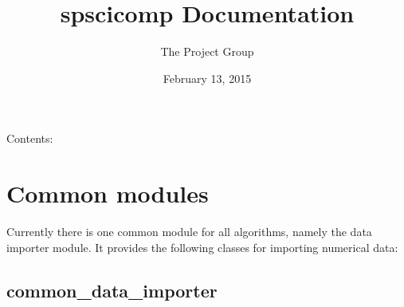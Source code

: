 \documentclass[letterpaper,10pt,english]{sphinxmanual}
\title{spscicomp Documentation}
\date{February 13, 2015}
\author{The Project Group}
\begin{document}
\maketitle
\tableofcontents
{}\label{index::doc}


Contents:


\chapter{Common modules}
\label{common:welcome-to-spscicomp-s-documentation}\label{common::doc}\label{common:common-modules}
Currently there is one common module for all algorithms, namely the data importer module. It provides the following classes for importing numerical data:


\section{common\_data\_importer}
\label{common:common-data-importer}\label{common:module-common_data_importer}
\end{document}

